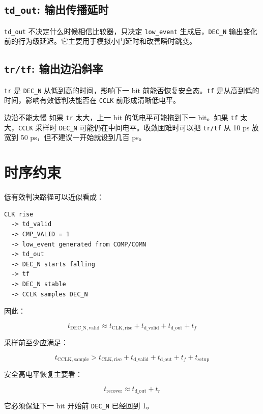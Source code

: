 \documentclass[11pt,a4paper,UTF8]{ctexart}
\begin{document}
\subsection{\texttt{td\_out}: 输出传播延时}

\texttt{td\_out} 不决定什么时候相信比较器，只决定 \texttt{low\_event} 生成后，\texttt{DEC\_N} 输出变化前的行为级延迟。它主要用于模拟小门延时和改善瞬时跳变。

\subsection{\texttt{tr/tf}: 输出边沿斜率}

\texttt{tr} 是 \texttt{DEC\_N} 从低到高的时间，影响下一 bit 前能否恢复安全态。\texttt{tf} 是从高到低的时间，影响有效低判决能否在 \texttt{CCLK} 前形成清晰低电平。

\begin{riskbox}{边沿不能太慢}
如果 \texttt{tr} 太大，上一 bit 的低电平可能拖到下一 bit。如果 \texttt{tf} 太大，\texttt{CCLK} 采样时 \texttt{DEC\_N} 可能仍在中间电平。收敛困难时可以把 \texttt{tr/tf} 从 10 ps 放宽到 50 ps，但不建议一开始就设到几百 ps。
\end{riskbox}

\section{时序约束}

低有效判决路径可以近似看成：

\begin{lstlisting}[style=va,numbers=none]
CLK rise
  -> td_valid
  -> CMP_VALID = 1
  -> low_event generated from COMP/COMN
  -> td_out
  -> DEC_N starts falling
  -> tf
  -> DEC_N stable
  -> CCLK samples DEC_N
\end{lstlisting}

因此：

\[
t_{\mathrm{DEC\_N,valid}}
\approx
t_{\mathrm{CLK,rise}} + t_{\mathrm{d\_valid}} + t_{\mathrm{d\_out}} + t_f
\]

采样前至少应满足：

\[
t_{\mathrm{CCLK,sample}}
>
t_{\mathrm{CLK,rise}} + t_{\mathrm{d\_valid}} + t_{\mathrm{d\_out}} + t_f + t_{\mathrm{setup}}
\]

安全高电平恢复主要看：

\[
t_{\mathrm{recover}} \approx t_{\mathrm{d\_out}} + t_r
\]

它必须保证下一 bit 开始前 \texttt{DEC\_N} 已经回到 1。
\end{document}
